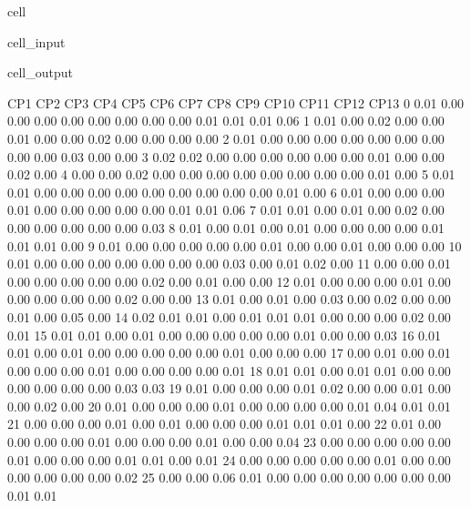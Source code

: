 \documentclass[letterpaper,10pt,french]{sphinxmanual}
\begin{document}
\begin{sphinxuseclass}{cell}
\begin{sphinxuseclass}{cell_input}
\end{sphinxuseclass}
\begin{sphinxuseclass}{cell_output}
\begin{sphinxVerbatim}[commandchars=\\\{\}]
            	CP1	CP2	CP3	CP4	CP5	CP6	CP7	CP8	CP9	CP10	CP11	CP12	CP13 
         0	0.01 	0.00 	0.00 	0.00 	0.00 	0.00 	0.00 	0.00 	0.00 	0.01 	0.01 	0.01 	0.06
         1	0.01 	0.00 	0.02 	0.00 	0.00 	0.01 	0.00 	0.00 	0.02 	0.00 	0.00 	0.00 	0.00
         2	0.01 	0.00 	0.00 	0.00 	0.00 	0.00 	0.00 	0.00 	0.00 	0.00 	0.03 	0.00 	0.00
         3	0.02 	0.02 	0.00 	0.00 	0.00 	0.00 	0.00 	0.00 	0.01 	0.00 	0.00 	0.02 	0.00
         4	0.00 	0.00 	0.02 	0.00 	0.00 	0.00 	0.00 	0.00 	0.00 	0.00 	0.00 	0.01 	0.00
         5	0.01 	0.01 	0.00 	0.00 	0.00 	0.00 	0.00 	0.00 	0.00 	0.00 	0.00 	0.01 	0.00
         6	0.01 	0.00 	0.00 	0.00 	0.01 	0.00 	0.00 	0.00 	0.00 	0.00 	0.01 	0.01 	0.06
         7	0.01 	0.01 	0.00 	0.01 	0.00 	0.02 	0.00 	0.00 	0.00 	0.00 	0.00 	0.00 	0.03
         8	0.01 	0.00 	0.01 	0.00 	0.01 	0.00 	0.00 	0.00 	0.00 	0.01 	0.01 	0.01 	0.00
         9	0.01 	0.00 	0.00 	0.00 	0.00 	0.00 	0.01 	0.00 	0.00 	0.01 	0.00 	0.00 	0.00
        10	0.01 	0.00 	0.00 	0.00 	0.00 	0.00 	0.00 	0.00 	0.03 	0.00 	0.01 	0.02 	0.00
        11	0.00 	0.00 	0.01 	0.00 	0.00 	0.00 	0.00 	0.00 	0.02 	0.00 	0.01 	0.00 	0.00
        12	0.01 	0.00 	0.00 	0.00 	0.01 	0.00 	0.00 	0.00 	0.00 	0.00 	0.02 	0.00 	0.00
        13	0.01 	0.00 	0.01 	0.00 	0.03 	0.00 	0.02 	0.00 	0.00 	0.01 	0.00 	0.05 	0.00
        14	0.02 	0.01 	0.01 	0.00 	0.01 	0.01 	0.01 	0.00 	0.00 	0.00 	0.02 	0.00 	0.01
        15	0.01 	0.01 	0.00 	0.01 	0.00 	0.00 	0.00 	0.00 	0.00 	0.01 	0.00 	0.00 	0.03
        16	0.01 	0.01 	0.00 	0.01 	0.00 	0.00 	0.00 	0.00 	0.00 	0.01 	0.00 	0.00 	0.00
        17	0.00 	0.01 	0.00 	0.01 	0.00 	0.00 	0.00 	0.01 	0.00 	0.00 	0.00 	0.00 	0.01
        18	0.01 	0.01 	0.00 	0.01 	0.01 	0.00 	0.00 	0.00 	0.00 	0.00 	0.00 	0.03 	0.03
        19	0.01 	0.00 	0.00 	0.00 	0.01 	0.02 	0.00 	0.00 	0.01 	0.00 	0.00 	0.02 	0.00
        20	0.01 	0.00 	0.00 	0.00 	0.01 	0.00 	0.00 	0.00 	0.00 	0.01 	0.04 	0.01 	0.01
        21	0.00 	0.00 	0.00 	0.01 	0.00 	0.01 	0.00 	0.00 	0.00 	0.01 	0.01 	0.01 	0.00
        22	0.01 	0.00 	0.00 	0.00 	0.00 	0.01 	0.00 	0.00 	0.00 	0.01 	0.00 	0.00 	0.04
        23	0.00 	0.00 	0.00 	0.00 	0.00 	0.01 	0.00 	0.00 	0.00 	0.01 	0.01 	0.00 	0.01
        24	0.00 	0.00 	0.00 	0.00 	0.00 	0.01 	0.00 	0.00 	0.00 	0.00 	0.00 	0.00 	0.02
        25	0.00 	0.00 	0.06 	0.01 	0.00 	0.00 	0.00 	0.00 	0.00 	0.00 	0.00 	0.01 	0.01

\end{sphinxVerbatim}
\end{sphinxuseclass}
\end{sphinxuseclass}
\end{document}
